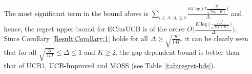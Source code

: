 
The most significant term in the bound above is $\sum_{i\in A:\Delta_{i}\geq b}\frac{64\log{\big(T\frac{\Delta_{i}^{2}}{\sqrt{\log (K)}}\big)}}{\Delta_{i}}$ and hence, the regret upper bound for EClusUCB is of the order $O\bigg(\frac{K\log \big(\frac{T\Delta^{2}}{\sqrt{\log (K)}}\big)}{\Delta}\bigg)$. 
Since Corollary \ref{Result:Corollary:1} holds for all $\Delta \geq \sqrt{\frac{K}{14 T}} $, it can be clearly seen that for all $\sqrt{\frac{K}{14 T}} \leq \Delta\leq 1$ and $K\geq 2$, the gap-dependent bound is better than that of UCB1, UCB-Improved and MOSS (see Table~\ref{tab:regret-bds}). 




